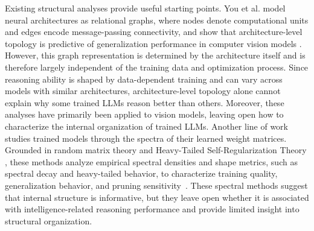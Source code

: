 Existing structural analyses provide useful starting points. You et al. model neural architectures as relational graphs, where nodes denote computational units and edges encode message-passing connectivity, and show that architecture-level topology is predictive of generalization performance in computer vision models \cite{you2020graph}. However, this graph representation is determined by the architecture itself and is therefore largely independent of the training data and optimization process. Since reasoning ability is shaped by data-dependent training and can vary across models with similar architectures, architecture-level topology alone cannot explain why some trained LLMs reason better than others. Moreover, these analyses have primarily been applied to vision models, leaving open how to characterize the internal organization of trained LLMs.
Another line of work studies trained models through the spectra of their learned weight matrices. Grounded in random matrix theory and Heavy-Tailed Self-Regularization Theory \cite{hu2025eigenspectrum, lu2024alphapruning}, these methods analyze empirical spectral densities and shape metrics, such as spectral decay and heavy-tailed behavior, to characterize training quality, generalization behavior, and pruning sensitivity~\cite{martin2021predicting, yang2023test}.
These spectral methods suggest that internal structure is informative, but they leave open whether it is associated with intelligence-related reasoning performance and provide limited insight into structural organization.
